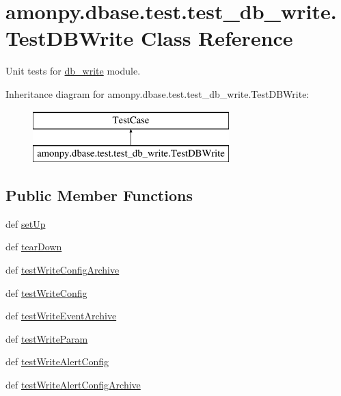 \hypertarget{classamonpy_1_1dbase_1_1test_1_1test__db__write_1_1_test_d_b_write}{\section{amonpy.\-dbase.\-test.\-test\-\_\-db\-\_\-write.\-Test\-D\-B\-Write Class Reference}
\label{classamonpy_1_1dbase_1_1test_1_1test__db__write_1_1_test_d_b_write}
}


Unit tests for \hyperlink{namespaceamonpy_1_1dbase_1_1db__write}{db\-\_\-write} module.  


Inheritance diagram for amonpy.\-dbase.\-test.\-test\-\_\-db\-\_\-write.\-Test\-D\-B\-Write\-:\begin{figure}[H]
\begin{center}
\leavevmode
\includegraphics[height=2.000000cm]{db/d42/classamonpy_1_1dbase_1_1test_1_1test__db__write_1_1_test_d_b_write}
\end{center}
\end{figure}
\subsection*{Public Member Functions}
\begin{DoxyCompactItemize}
\item 
def \hyperlink{classamonpy_1_1dbase_1_1test_1_1test__db__write_1_1_test_d_b_write_a8ef76286fea5446138811375fb7f66b5}{set\-Up}
\item 
def \hyperlink{classamonpy_1_1dbase_1_1test_1_1test__db__write_1_1_test_d_b_write_aa32d3bef1374ed78d24d9576db67efab}{tear\-Down}
\item 
def \hyperlink{classamonpy_1_1dbase_1_1test_1_1test__db__write_1_1_test_d_b_write_a8f1e78ed7fb69e2163ad947a634d4326}{test\-Write\-Config\-Archive}
\item 
def \hyperlink{classamonpy_1_1dbase_1_1test_1_1test__db__write_1_1_test_d_b_write_ac4c72893a065ccb14cd9e572fc623f9a}{test\-Write\-Config}
\item 
def \hyperlink{classamonpy_1_1dbase_1_1test_1_1test__db__write_1_1_test_d_b_write_a894227c7d803e8555a9a979731afd2d7}{test\-Write\-Event\-Archive}
\item 
def \hyperlink{classamonpy_1_1dbase_1_1test_1_1test__db__write_1_1_test_d_b_write_adc4ec167459df746be42a7a073a51d48}{test\-Write\-Param}
\item 
def \hyperlink{classamonpy_1_1dbase_1_1test_1_1test__db__write_1_1_test_d_b_write_a9b9222ada5fd3532585ba40f40edf557}{test\-Write\-Alert\-Config}
\item 
def \hyperlink{classamonpy_1_1dbase_1_1test_1_1test__db__write_1_1_test_d_b_write_a641168c24adc718f73109142ee79ca7d}{test\-Write\-Alert\-Config\-Archive}
\end{DoxyCompactItemize}
